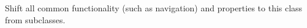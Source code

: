 
\begin{DoxyRefList}
\item[\label{todo__todo000001}%
\hypertarget{todo__todo000001}{}%
Class \hyperlink{classAgent}{Agent} ]Shift all common functionality (such as navigation) and properties to this class from subclasses.


\end{DoxyRefList}